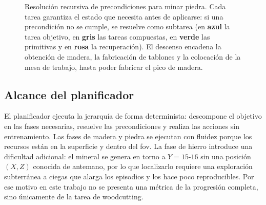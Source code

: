 \begin{figure}[htbp]
{
  }
  \caption[Resolución recursiva de precondiciones]{Resolución recursiva de
  precondiciones para minar piedra. Cada tarea garantiza el estado que necesita
  antes de aplicarse: si una precondición no se cumple, se resuelve como subtarea
  (en \textbf{azul} la tarea objetivo, en \textbf{gris} las tareas compuestas,
  en \textbf{verde} las primitivas y en \textbf{rosa} la recuperación). El descenso
  encadena la obtención de madera, la fabricación de tablones y la colocación de la
  mesa de trabajo, hasta poder fabricar el pico de madera.}
  \label{fig:htn-precond}
\end{figure}

\subsection{Alcance del planificador}
El planificador ejecuta la jerarquía de forma determinista: descompone el objetivo en
las fases necesarias, resuelve las precondiciones y realiza las acciones sin
entrenamiento. Las fases de madera y piedra se ejecutan con fluidez porque los
recursos están en la superficie y dentro del \gls{fov}. La fase de hierro introduce
una dificultad adicional: el mineral se genera en torno a $Y=15$-$16$ sin una
posición $(X,Z)$ conocida de antemano, por lo que localizarlo requiere una
exploración subterránea a ciegas que alarga los episodios y los hace poco
reproducibles. Por ese motivo en este trabajo no se presenta una métrica de la
progresión completa, sino únicamente de la tarea de \gls{woodcutting}.